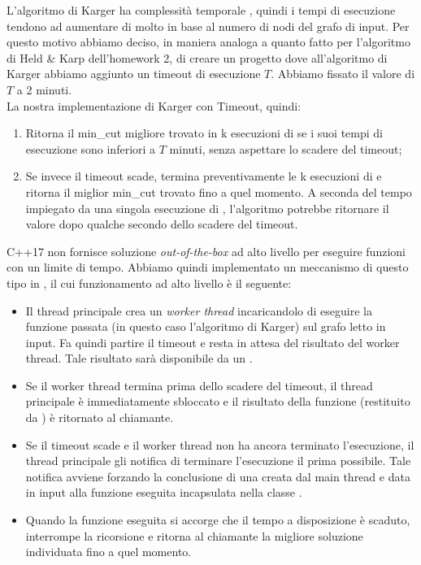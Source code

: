 \noindent L'algoritmo di Karger ha complessità temporale \complexityKargerTime{}, quindi i tempi di esecuzione tendono ad aumentare di molto in base al numero di nodi del grafo di input. Per questo motivo abbiamo deciso, in maniera analoga a quanto fatto per l'algoritmo di Held \& Karp dell'homework 2, di creare un progetto dove all'algoritmo di Karger abbiamo aggiunto un timeout di esecuzione $T$. Abbiamo fissato il valore di $T$ a 2 minuti.\\

\noindent La nostra implementazione di Karger con Timeout, quindi:

\begin{enumerate}
    \item Ritorna il min\_cut migliore trovato in k esecuzioni di  se i suoi tempi di esecuzione sono inferiori a $T$ minuti, senza aspettare lo scadere del timeout;
    \item Se invece il timeout scade, termina preventivamente le k esecuzioni di  e ritorna il miglior min\_cut trovato fino a quel momento. A seconda del tempo impiegato da una singola esecuzione di , l'algoritmo potrebbe ritornare il valore dopo qualche secondo dello scadere del timeout.
\end{enumerate}

\noindent C++17 non fornisce soluzione \textit{out-of-the-box} ad alto livello per eseguire funzioni con un limite di tempo. Abbiamo quindi implementato un meccanismo di questo tipo in , il cui funzionamento ad alto livello è il seguente:

\begin{itemize}
    \item Il thread principale crea un \textit{worker thread} incaricandolo di eseguire la funzione passata (in questo caso l'algoritmo di Karger) sul grafo letto in input. Fa quindi partire il timeout e resta in attesa del risultato del worker thread. Tale risultato sarà disponibile da un .
    \item Se il worker thread termina prima dello scadere del timeout, il thread principale è immediatamente sbloccato e il risultato della funzione (restituito da ) è ritornato al chiamante.
    \item Se il timeout scade e il worker thread non ha ancora terminato l'esecuzione, il thread principale gli notifica di terminare l'esecuzione il prima possibile. Tale notifica avviene forzando la conclusione di una  creata dal main thread e data in input alla funzione eseguita incapsulata nella classe .
    \item Quando la funzione eseguita si accorge che il tempo a disposizione è scaduto, interrompe la ricorsione e ritorna al chiamante la migliore soluzione individuata fino a quel momento.
\end{itemize}
